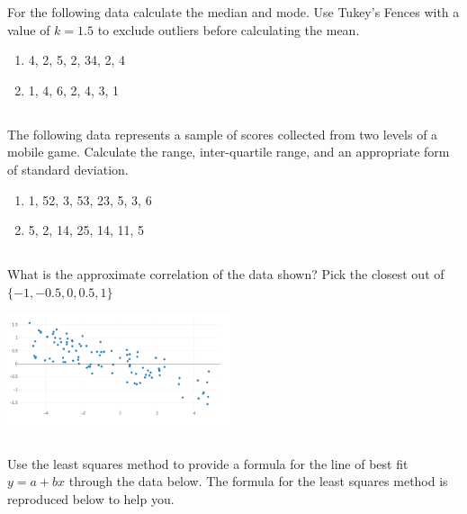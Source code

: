 \documentclass[twocolumn]{article}
\begin{document}
    For the following data calculate the median and mode. Use Tukey's Fences with a value of $k=1.5$ to exclude outliers before calculating the mean.

    \begin{enumerate}
        \item 4, 2, 5, 2, 34, 2, 4
        \item 1, 4, 6, 2, 4, 3, 1
    \end{enumerate}

\subsection{}

    The following data represents a sample of scores collected from two levels of a mobile game. Calculate the range, inter-quartile range, and an appropriate form of standard deviation.  

    \begin{enumerate}
        \item 1, 52, 3, 53, 23, 5, 3, 6
        \item 5, 2, 14, 25, 14, 11, 5
    \end{enumerate}

\subsection{}

    What is the approximate correlation of the data shown? Pick the closest out of $\{-1, -0.5, 0, 0.5, 1\}$

       \includegraphics[width=0.49\textwidth]{correlation}

\subsection{}

    Use the least squares method to provide a formula for the line of best fit $y = a + bx$ through the data below. The formula for the least squares method is reproduced below to help you.
\end{document}
